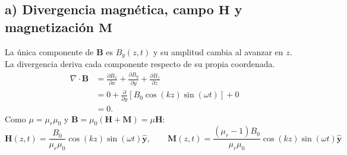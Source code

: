 \documentclass[11pt]{article}
\begin{document}
\subsection*{a) Divergencia magnética, campo $\mathbf{H}$ y magnetización $\mathbf{M}$}
La única componente de $\mathbf B$ es $B_y(z,t)$ y su amplitud
cambia al avanzar en $z$. La divergencia deriva cada componente
respecto de su propia coordenada.
\begin{align*}
    \nabla\cdot\mathbf B
    &=\frac{\partial B_x}{\partial x}
      +\frac{\partial B_y}{\partial y}
      +\frac{\partial B_z}{\partial z}\\
    &=0+\frac{\partial}{\partial y}
       [B_0\cos(kz)\sin(\omega t)]+0\\
    &=0.
\end{align*}
Como $\mu = \mu_r \mu_0$ y $\mathbf{B} = \mu_0(\mathbf{H} + \mathbf{M}) = \mu \mathbf{H}$:
\begin{equation}
    \mathbf{H}(z,t) = \frac{B_0}{\mu_r \mu_0} \cos(kz) \sin(\omega t) \hat{\mathbf{y}}, \qquad \mathbf{M}(z,t) = \frac{(\mu_r - 1) B_0}{\mu_r \mu_0} \cos(kz) \sin(\omega t) \hat{\mathbf{y}}
\end{equation}
\end{document}
